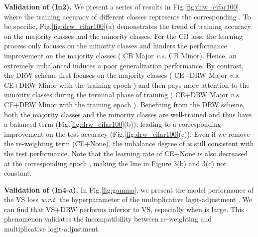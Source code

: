 \textbf{Validation of (In2).} We present a series of results in Fig.\ref{fig:drw_cifar100}, where the training accuracy of different classes represents the corresponding . To be specific, Fig.\ref{fig:drw_cifar100}(a) demonstrates the trend of training accuracy on the majority classes and the minority classes. For the CB loss, the learning process only focuses on the minority classes and hinders the performance improvement on the majority classes ({\color[RGB]{64, 182, 251} CB Major} \textit{v.s.} {\color[RGB]{64, 215, 189} CB Minor}). Hence, an extremely imbalanced  induces a poor generalization performance. By contrast, the DRW scheme first focuses on the majority classes ({\color[RGB]{252, 136, 123} CE+DRW Major} \textit{v.s.} {\color[RGB]{255, 213, 135} CE+DRW Minor} with the training epoch ) and then pays more attention to the minority classes during the terminal phase of training ({\color[RGB]{252, 136, 123} CE+DRW Major} \textit{v.s.} {\color[RGB]{255, 213, 135} CE+DRW Minor} with the training epoch ). Benefiting from the DRW scheme, both the majority classes and the minority classes are well-trained and thus have a balanced term  (Fig.\ref{fig:drw_cifar100}(b)), leading to a corresponding improvement on the test accuracy (Fig.\ref{fig:drw_cifar100}(c)). Even if we remove the re-weighting term ({\color[RGB]{250, 152, 146}CE+None}), the imbalance degree of  is still consistent with the test performance. Note that the learning rate of CE+None is also decreased at the corresponding epoch , making the line in Figure 3(b) and 3(c) not constant.

\textbf{Validation of (In4-a).} In Fig.\ref{fig:gamma}, we present the model performance of the VS loss \textit{w.r.t.} the hyperparameter of the multiplicative logit-adjustment . We can find that {\color[RGB]{252, 136, 123} VS+DRW} performs inferior to {\color[RGB]{64, 207, 211} VS}, especially when  is large. This phenomenon validates the incompatibility between re-weighting and multiplicative logit-adjustment.

